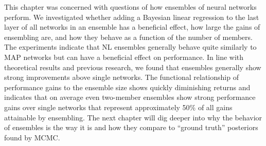 \documentclass[../thesis.tex]{subfiles}
\begin{document}
This chapter was concerned with questions of how ensembles of neural networks perform. We investigated whether adding a Bayesian linear regression to the last layer of all networks in an ensemble has a beneficial effect, how large the gains of ensembling are, and how they behave as a function of the number of members. The experiments indicate that NL ensembles generally behave quite similarly to MAP networks but can have a beneficial effect on performance. In line with theoretical results and previous research, we found that ensembles generally show strong improvements above single networks. The functional relationship of performance gains to the ensemble size shows quickly diminishing returns and indicates that on average even two-member ensembles show strong performance gains over single networks that represent approximately 50\% of all gains attainable by ensembling. The next chapter will dig deeper into why the behavior of ensembles is the way it is and how they compare to ``ground truth'' posteriors found by MCMC.
\end{document}
